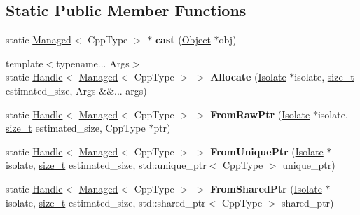 \subsection*{Static Public Member Functions}
\begin{DoxyCompactItemize}
\item 
\mbox{\label{classv8_1_1internal_1_1Managed_a52fc73e4759af99a28e42e9b4cb2a377}} 
static \mbox{\hyperlink{classv8_1_1internal_1_1Managed}{Managed}}$<$ Cpp\+Type $>$ $\ast$ {\bfseries cast} (\mbox{\hyperlink{classv8_1_1internal_1_1Object}{Object}} $\ast$obj)
\item 
\mbox{\label{classv8_1_1internal_1_1Managed_ac2781c0a8d4be01b8a4bc0f63679da7b}} 
{\footnotesize template$<$typename... Args$>$ }\\static \mbox{\hyperlink{classv8_1_1internal_1_1Handle}{Handle}}$<$ \mbox{\hyperlink{classv8_1_1internal_1_1Managed}{Managed}}$<$ Cpp\+Type $>$ $>$ {\bfseries Allocate} (\mbox{\hyperlink{classv8_1_1internal_1_1Isolate}{Isolate}} $\ast$isolate, \mbox{\hyperlink{classsize__t}{size\+\_\+t}} estimated\+\_\+size, Args \&\&... args)
\item 
\mbox{\label{classv8_1_1internal_1_1Managed_a6f451f97ea09be48b76e92db54e8ab06}} 
static \mbox{\hyperlink{classv8_1_1internal_1_1Handle}{Handle}}$<$ \mbox{\hyperlink{classv8_1_1internal_1_1Managed}{Managed}}$<$ Cpp\+Type $>$ $>$ {\bfseries From\+Raw\+Ptr} (\mbox{\hyperlink{classv8_1_1internal_1_1Isolate}{Isolate}} $\ast$isolate, \mbox{\hyperlink{classsize__t}{size\+\_\+t}} estimated\+\_\+size, Cpp\+Type $\ast$ptr)
\item 
\mbox{\label{classv8_1_1internal_1_1Managed_a3af529d055f2f5d3f7a3e2f9ad07eb68}} 
static \mbox{\hyperlink{classv8_1_1internal_1_1Handle}{Handle}}$<$ \mbox{\hyperlink{classv8_1_1internal_1_1Managed}{Managed}}$<$ Cpp\+Type $>$ $>$ {\bfseries From\+Unique\+Ptr} (\mbox{\hyperlink{classv8_1_1internal_1_1Isolate}{Isolate}} $\ast$isolate, \mbox{\hyperlink{classsize__t}{size\+\_\+t}} estimated\+\_\+size, std\+::unique\+\_\+ptr$<$ Cpp\+Type $>$ unique\+\_\+ptr)
\item 
\mbox{\label{classv8_1_1internal_1_1Managed_adabf82af80de14258f5a968de0cd1a06}} 
static \mbox{\hyperlink{classv8_1_1internal_1_1Handle}{Handle}}$<$ \mbox{\hyperlink{classv8_1_1internal_1_1Managed}{Managed}}$<$ Cpp\+Type $>$ $>$ {\bfseries From\+Shared\+Ptr} (\mbox{\hyperlink{classv8_1_1internal_1_1Isolate}{Isolate}} $\ast$isolate, \mbox{\hyperlink{classsize__t}{size\+\_\+t}} estimated\+\_\+size, std\+::shared\+\_\+ptr$<$ Cpp\+Type $>$ shared\+\_\+ptr)
\end{DoxyCompactItemize}
